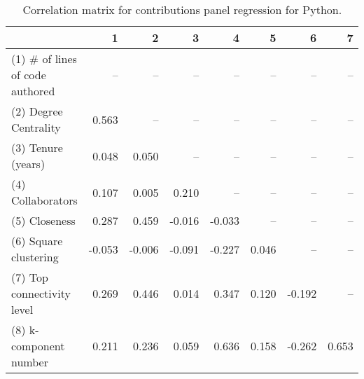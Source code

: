 \begin{table}[H]
\caption{Correlation matrix for contributions panel regression for Python.}
\label{corr_table_panel}
\begin{center}
\begin{tabular}{lrrrrrrr}
\toprule
{} &      1 &      2 &      3 &      4 &     5 &      6 &     7 \\
\midrule
(1) \# of lines of code authored &    -- &    -- &    -- &    -- &   -- &    -- &   -- \\
(2) Degree Centrality           &  0.563 &    -- &    -- &    -- &   -- &    -- &   -- \\
(3) Tenure (years)              &  0.048 &  0.050 &    -- &    -- &   -- &    -- &   -- \\
(4) Collaborators               &  0.107 &  0.005 &  0.210 &    -- &   -- &    -- &   -- \\
(5) Closeness                   &  0.287 &  0.459 & -0.016 & -0.033 &   -- &    -- &   -- \\
(6) Square clustering           & -0.053 & -0.006 & -0.091 & -0.227 & 0.046 &    -- &   -- \\
(7) Top connectivity level      &  0.269 &  0.446 &  0.014 &  0.347 & 0.120 & -0.192 &   -- \\
(8) k-component number          &  0.211 &  0.236 &  0.059 &  0.636 & 0.158 & -0.262 & 0.653 \\
\bottomrule
\end{tabular}
\end{center} 
\end{table}
